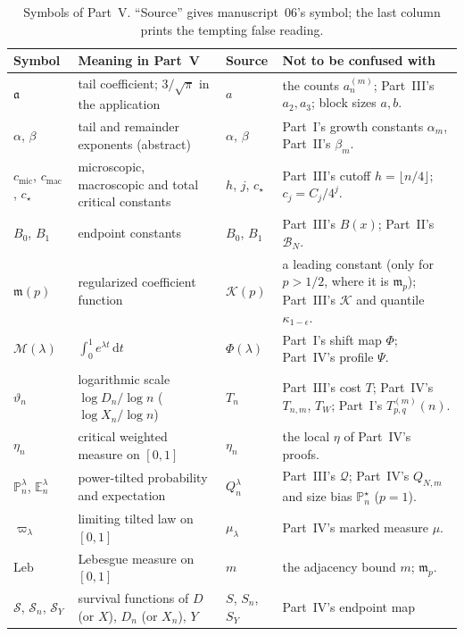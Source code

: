\documentclass[11pt,a4paper]{article}
\theoremstyle{definition}\newaliascnt{definition}{theorem}
\theoremstyle{remark}\newaliascnt{remark}{theorem}
\newcommand{\dd}{\mathrm d}
\newcommand{\Bformal}{\mathcal B}%
\newcommand{\ljP}{\mathbb P}
\newcommand{\ljE}{\mathbb E}
\newcommand{\ljQ}{\mathcal Q}
\newcommand{\ljK}{\mathcal K}
\newcommand{\cjmic}{c_{\mathrm{mic}}}
\newcommand{\cjmac}{c_{\mathrm{mac}}}
\newcommand{\cjLeb}{\mathrm{Leb}}
\begin{document}
\begin{table}[htbp]
\centering\small
\caption{Symbols of Part~V. ``Source'' gives manuscript~06's symbol; the last
column prints the tempting false reading.}
\label{cjm:tab:notation}
\begin{tabular}{>{\raggedright}p{.18\linewidth}>{\raggedright}p{.29\linewidth}>{\raggedright}p{.13\linewidth}>{\raggedright\arraybackslash}p{.28\linewidth}}
\toprule
Symbol & Meaning in Part~V & Source & Not to be confused with\\
\midrule
$\mathfrak a$ & tail coefficient; $3/\sqrt\pi$ in the application & $a$ &
 the counts $a_n^{(m)}$; Part~III's $a_2,a_3$; block sizes $a,b$.\\
$\alpha$, $\beta$ & tail and remainder exponents (abstract) & $\alpha$,
 $\beta$ & Part~I's growth constants $\alpha_m$, Part~II's $\beta_m$.\\
$\cjmic$, $\cjmac$, $c_\star$ & microscopic, macroscopic and total critical
 constants & $h$, $j$, $c_\star$ & Part~III's cutoff $h=\lfloor n/4\rfloor$;
 $c_j=C_j/4^j$.\\
$B_0$, $B_1$ & endpoint constants & $B_0$, $B_1$ & Part~III's $B(x)$;
 Part~II's $\Bformal_N$.\\
$\mathfrak m(p)$ & regularized coefficient function & $\mathcal K(p)$ &
 a leading constant (only for $p>1/2$, where it is $\mathfrak m_p$);
 Part~III's $\ljK$ and quantile $\kappa_{1-\epsilon}$.\\
$\mathcal M(\lambda)$ & $\int_0^1e^{\lambda t}\,\dd t$ & $\Phi(\lambda)$ &
 Part~I's shift map $\Phi$; Part~IV's profile $\Psi$.\\
$\vartheta_n$ & logarithmic scale $\log D_n/\log n$ ($\log X_n/\log n$) &
 $T_n$ & Part~III's cost $T$; Part~IV's $T_{n,m}$, $T_W$; Part~I's
 $T^{(m)}_{p,q}(n)$.\\
$\eta_n$ & critical weighted measure on $[0,1]$ & $\eta_n$ & the local
 $\eta$ of Part~IV's proofs.\\
$\ljP^\lambda_n$, $\ljE^\lambda_n$ & power-tilted probability and expectation
 & $Q_n^\lambda$ & Part~III's $\ljQ$; Part~IV's $Q_{N,m}$ and size bias
 $\ljP^\star_n$ ($p=1$).\\
$\varpi_\lambda$ & limiting tilted law on $[0,1]$ & $\mu_\lambda$ &
 Part~IV's marked measure $\mu$.\\
$\cjLeb$ & Lebesgue measure on $[0,1]$ & $m$ & the adjacency bound $m$;
 $\mathfrak m_p$.\\
$\mathcal S$, $\mathcal S_n$, $\mathcal S_Y$ & survival functions of $D$ (or
 $X$), $D_n$ (or $X_n$), $Y$ & $S$, $S_n$, $S_Y$ & Part~IV's endpoint map

\end{tabular}
\end{table}
\end{document}
